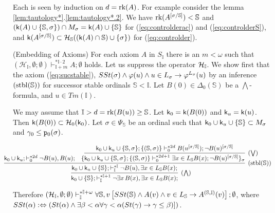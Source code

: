 \documentclass{article}
\newcommand{\mS}{\mathbb{S}}
\newcommand{\mI}{\mathbb{I}}
\begin{document}
\elem
\bprf
Each is seen by induction on $d=\mbox{{\rm rk}}(A)$.
For example consider the lemma \ref{lem:tautology*}.\ref{lem:tautology*.2}.
We have $\rk(A^{[\sig/\mS]})<\mS$ and
$(\sfk(A)\cup\{\mS,\sig\})\cap M_{\sig}=\sfk(A)\cup\{\mS\}$ for (\ref{eq:controlderac}) and (\ref{eq:controlderS}),
and $\sfk(A^{[\sig/\mS]})\subset\calh_{\mS}((\sfk(A)\cap\mS)\cup\{\sig\})$ for (\ref{eq:controlder}).
\eprf



\blem\label{th:embedreg}{\rm (Embedding of Axioms)}
For each axiom $A$ in $S_{\mI}$ 
there is an $m<\omega$ such that
 $(\mathcal{H}_{\mI},\emptyset;\emptyset)
 \vdash^{* \mI\cdot 2}_{\mI+m} A;\emptyset$
holds.
\elem
\bprf
Let us suppress the operator $\calh_{\mI}$.
We show first that the axiom (\ref{eq:sucstable}),
$SSt(\sigma)\land \varphi(u) \land u\in L_{\sigma} \to \varphi^{L_{\sigma}}(u)$
by an inference $({\rm stbl}(\mathbb{S}))$ for successor stable ordinals $\mathbb{S}<\mI$.
Let $B(0)\in\Delta_{0}(\mathbb{S})$ be a $\bigwedge$-formula,
and $u\in Tm(\mI)$.

We may assume that
$\mI>d={\rm rk}(B(u))\geq\mathbb{S}$.
Let ${\sf k}_{0}={\sf k}(B(0))$ and ${\sf k}_{u}={\sf k}(u)$.
Then ${\sf k}(B(0))\subset{\cal H}_{0}({\sf k}_{0})$.
Let $\sigma\in\Psi_{\mS}$ be an ordinal such that 
${\sf k}_{0}\cup{\sf k}_{u}\cup\{\mS\}\subset M_{\sig}$ and 
$\gamma_{0}\leq{\tt p}_{0}(\sigma)$. 

{\footnotesize
\[
\hspace{-5mm}
\infer[(\bigwedge)]{ {\sf k}_{0}\cup\{\mS\};\vdash^{* \mathbb{I}+1}_{\mathbb{I}}
 \lnot \exists x\, B(x),\exists x\in L_{\mathbb{S}}B(x);}
 {
 \infer[({\rm stbl}(\mS))]{{\sf k}_{0}\cup{\sf k}_{u}\cup\{\mS\}; \vdash^{* \mathbb{I}}_{\mathbb{I}}
    \lnot B(u),\exists x\in L_{\mathbb{S}}B(x);}
    {
     {\sf k}_{0}\cup{\sf k}_{u};  \vdash^{* 2d}_{0}\lnot B(u),B(u);
    &
    \{
    \infer[(\bigvee)]{{\sf k}_{0}\cup\sfk_{u}\cup\{\mS,\sig\};\{(\mS,\sig)\}\vdash^{* 2d+1}_{0}
     \exists x\in L_{\mathbb{S}}B(x);\lnot B(u)^{[\sigma/\mathbb{S}]}
     \}_{\sig}
     }
     {
     {\sf k}_{0}\cup{\sf k}_{u}\cup\{\mS,\sig\};\{(\mS,\sig)\} \vdash^{* 2d}_{0}
      B(u^{[\sigma/\mathbb{S}]}); \lnot B(u)^{[\sigma/\mathbb{S}]}
     }
    }
 }
\]
}


Therefore
$(\mathcal{H}_{\mI}, \emptyset;\emptyset)\vdash^{* \mI+\ome}_{\mI}
\fal\mS,v
\left[
SSt(\mS)\land
A(v) \land v\in L_{\mathbb{S}} \to A^{(\mathbb{S},\mI)}(v)
\right];\emptyset$, where
\\
$SSt(\alpha):\Leftrightarrow
\left(St(\alpha)\land \exists\beta<\alpha
\forall \gamma<\alpha(St(\gamma)\to \gamma\leq\beta)]\right)$.
\end{document}

